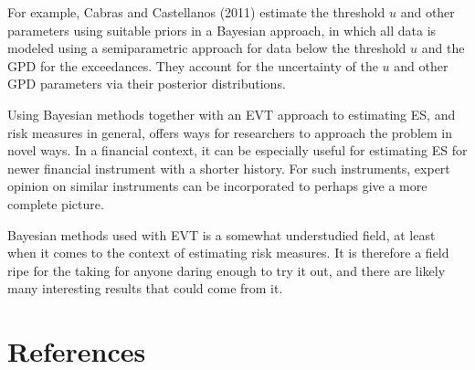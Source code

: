 \documentclass[a4paper,11pt]{article}
\theoremstyle{definition}
\theoremstyle{definition}
\theoremstyle{definition}
\theoremstyle{definition}
\theoremstyle{remark}
\begin{document}
For example, Cabras and Castellanos (2011) estimate the threshold \(u\) and other parameters using suitable priors in a Bayesian approach, in which all data is modeled using a semiparametric approach for data below the threshold \(u\) and the GPD for the exceedances. They account for the uncertainty of the \(u\) and other GPD parameters via their posterior distributions.

Using Bayesian methods together with an EVT approach to estimating ES, and risk measures in general, offers ways for researchers to approach the problem in novel ways. In a financial context, it can be especially useful for estimating ES for newer financial instrument with a shorter history. For such instruments, expert opinion on similar instruments can be incorporated to perhaps give a more complete picture.

Bayesian methods used with EVT is a somewhat understudied field, at least when it comes to the context of estimating risk measures. It is therefore a field ripe for the taking for anyone daring enough to try it out, and there are likely many interesting results that could come from it.

\newpage

\hypertarget{references}{%
\section*{References}\label{references}}

\noindent

\setlength{\parindent}{-0.5cm}
\setlength{\leftskip}{0.5cm}
\setlength{\parskip}{8pt}
\end{document}
